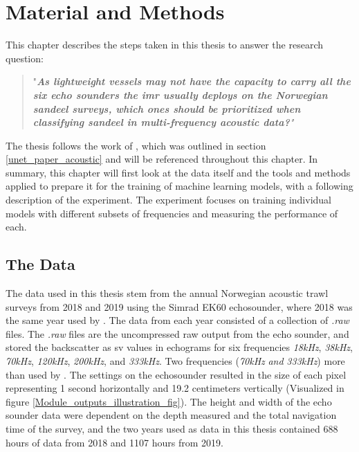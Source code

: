\chapter{Material and Methods} \label{methods}
    This chapter describes the steps taken in this thesis to answer the research question:
        \begin{quote}
        "\textit{\textbf{As lightweight vessels may not have the capacity to carry all the six echo sounders the \gls{imr} usually deploys on the Norwegian sandeel surveys, which ones should be prioritized when classifying sandeel in multi-frequency acoustic data?}"}
        \end{quote}
    
    The thesis follows the work of \citeauthor{brautaset2020acoustic}\cite{brautaset2020acoustic}, which was outlined in section \ref{unet_paper_acoustic} and will be referenced throughout this chapter. In summary, this chapter will first look at the data itself and the tools and methods applied to prepare it for the training of machine learning models, with a following description of the experiment. The experiment focuses on training individual models with different subsets of frequencies and measuring the performance of each.
    
    \section{The Data}
        The data used in this thesis stem from the annual Norwegian acoustic trawl surveys from 2018 and 2019 using the Simrad EK60 echosounder, where 2018 was the same year used by \citet{brautaset2020acoustic}. The data from each year consisted of a collection of \textit{.raw} files. The \textit{.raw} files are the uncompressed raw output from the echo sounder, and stored the backscatter as \gls{sv} values in echograms for six frequencies \textit{18kHz}, \textit{38kHz}, \textit{70kHz}, \textit{120kHz}, \textit{200kHz}, and \textit{333kHz}. Two frequencies (\textit{70kHz} \textit{and} \textit{333kHz}) more than used by \citet{brautaset2020acoustic} . The settings on the echosounder resulted in the size of each pixel representing 1 second horizontally and 19.2 centimeters vertically\cite{choi2021semi} (Visualized in figure \ref{Module_outputs_illustration_fig}). The height and width of the echo sounder data were dependent on the depth measured and the total navigation time of the survey, and the two years used as data in this thesis contained 688 hours of data from 2018 and 1107 hours from 2019.
        
